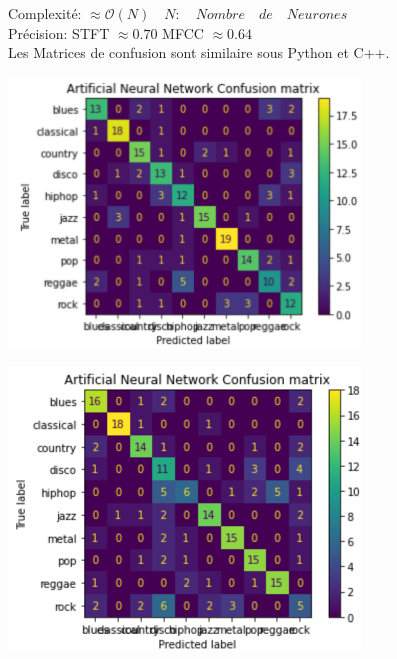 \documentclass[10pt]{article}
\begin{document}
Complexité: $\approx \mathcal{O}(N) \quad N:\quad Nombre \quad de \quad Neurones  $ \\ 
Précision: STFT $\approx 0.70$ MFCC $\approx 0.64$ \\
Les Matrices de confusion sont similaire sous Python et C++.

\begin{minipage}[t]{0.5\linewidth}
\includegraphics[width=0.7\textwidth]{ANN-ConfusionMatrix.png}

\end{minipage}
\begin{minipage}[t]{0.5\linewidth}

\includegraphics[width=0.7\textwidth]{ANN-ConfusionMatrix2.png}

\end{minipage}

\pagebreak

\end{document}
